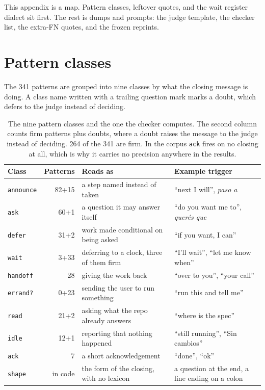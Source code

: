 
\appendix

This appendix is a map. Pattern classes, leftover quotes, and the wait
register dialect sit first. The rest is dumps and prompts: the judge
template, the checker list, the extra-FN quotes, and the frozen reprints.

\section{Pattern classes}
\label{app:classes}

The 341 patterns are grouped into nine classes by what the closing message is
doing. A class name written with a trailing question mark marks a doubt, which
defers to the judge instead of deciding.

\begin{table}[ht]
\centering
\begin{tabular}{lrp{4.0cm}p{5.0cm}}
\toprule
Class & Patterns & Reads as & Example trigger \\
\midrule
\texttt{announce} & 82+15 & a step named instead of taken & ``next I will'', \emph{paso a} \\
\texttt{ask} & 60+1 & a question it may answer itself & ``do you want me to'', \emph{quer\'es que} \\
\texttt{defer} & 31+2 & work made conditional on being asked & ``if you want, I can'' \\
\texttt{wait} & 3+33 & deferring to a clock, three of them firm & ``I'll wait'', ``let me know when'' \\
\texttt{handoff} & 28 & giving the work back & ``over to you'', ``your call'' \\
\texttt{errand?} & 0+23 & sending the user to run something & ``run this and tell me'' \\
\texttt{read} & 21+2 & asking what the repo already answers & ``where is the spec'' \\
\texttt{idle} & 12+1 & reporting that nothing happened & ``still running'', ``Sin cambios'' \\
\texttt{ack} & 7 & a short acknowledgement & ``done'', ``ok'' \\
\texttt{shape} & in code & the form of the closing, with no lexicon & a question at the end, a line ending on a colon \\
\bottomrule
\end{tabular}
\caption{The nine pattern classes and the one the checker computes. The second column counts firm patterns plus doubts, where a doubt raises the message to the judge instead of deciding. 264 of the 341 are firm. In the corpus \texttt{ack} fires on no closing at all, which is why it carries no precision anywhere in the results.}
\end{table}

